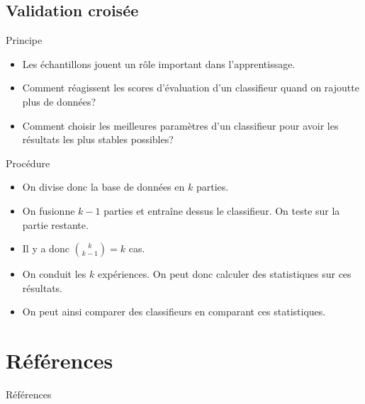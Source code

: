\documentclass[8pt]{beamer}
\begin{document}
		\subsection{Validation croisée}
			\begin{frame}{Principe}
				\begin{itemize}
					\item<1-> Les échantillons jouent un rôle important dans l'apprentissage.
					\item<2-> Comment réagissent les scores d'évaluation d'un classifieur quand on rajoutte plus de données?
					\item<3-> Comment choisir les meilleures paramètres d'un classifieur pour avoir les résultats les plus stables possibles?
				\end{itemize}
			\end{frame}
			\begin{frame}{Procédure}
				\begin{itemize}
					\item<1-> On divise donc la base de données en \(k\) parties.
					\item<2-> On fusionne \(k-1\) parties et entraîne dessus le classifieur. On teste sur la partie restante.
					\item<3-> Il y a donc \(\binom{k}{k-1} = k\) cas.
					\item<4-> On conduit les \(k\) expériences. On peut donc calculer des statistiques sur ces résultats.
					\item<5-> On peut ainsi comparer des classifieurs en comparant ces statistiques.
				\end{itemize}
			\end{frame}
	\section{Références}
	\begin{frame}[allowframebreaks]{Références}
		
		
	\end{frame}
\end{document}
